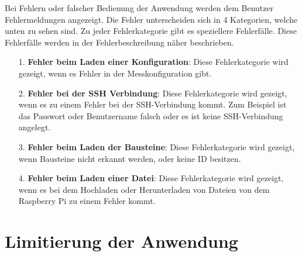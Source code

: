 \documentclass[parskip=full]{scrartcl}
\begin{document}
Bei Fehlern oder falscher Bedienung der Anwendung werden dem Benutzer Fehlermeldungen angezeigt. Die Fehler unterscheiden sich in 4 Kategorien, welche unten zu sehen sind. Zu jeder Fehlerkategorie gibt es speziellere Fehlerfälle. Diese Fehlerfälle werden in der Fehlerbeschreibung näher beschrieben.

\begin{itemize}


\item[1.] \textbf{Fehler beim Laden einer Konfiguration}: Diese Fehlerkategorie wird gezeigt, wenn es Fehler in der Messkonfiguration gibt.

\item[2.] \textbf{Fehler bei der SSH Verbindung}: Diese Fehlerkategorie wird gezeigt, wenn es zu einem Fehler bei der SSH-Verbindung kommt. Zum Beispiel ist das Passwort oder Benutzername falsch oder es ist keine SSH-Verbindung angelegt.

\item[3.] \textbf{Fehler beim Laden der Bausteine}: Diese Fehlerkategorie wird gezeigt, wenn Bausteine nicht erkannt werden, oder keine ID besitzen.

\item[4.] \textbf{Fehler beim Laden einer Datei}: Diese Fehlerkategorie wird gezeigt, wenn es bei dem Hochladen oder Herunterladen von Dateien von dem Raspberry Pi zu einem Fehler kommt.

\end{itemize}

\section{Limitierung der Anwendung}


\printnoidxglossaries				%
\end{document}
